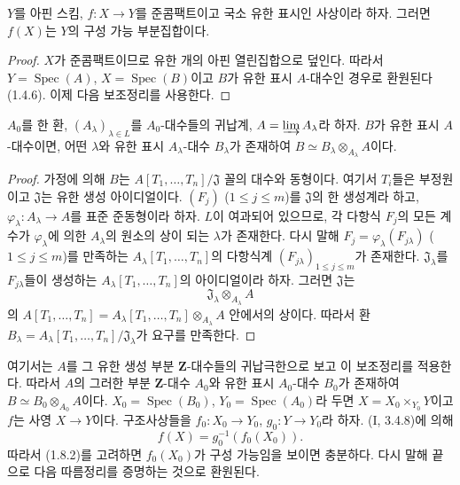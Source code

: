 \begin{lemma}[1.8.4.1]
\label{IV.1.8.4.1-fr}
$Y$를 아핀 스킴, $f:X\to Y$를 준콤팩트이고 국소 유한 표시인
사상이라 하자. 그러면 $f(X)$는 $Y$의 구성 가능 부분집합이다.
\end{lemma}

\begin{proof}
$X$가 준콤팩트이므로 유한 개의 아핀 열린집합으로 덮인다. 따라서
$Y=\operatorname{Spec}(A)$, $X=\operatorname{Spec}(B)$이고 $B$가
유한 표시 $A$-대수인 경우로 환원된다 (1.4.6). 이제 다음 보조정리를
사용한다.
\end{proof}

\begin{lemma}[1.8.4.2]
\label{IV.1.8.4.2-fr}
$A_0$를 한 환, $(A_\lambda)_{\lambda\in L}$를 $A_0$-대수들의
귀납계, $A=\varinjlim A_\lambda$라 하자. $B$가 유한 표시
$A$-대수이면, 어떤 $\lambda$와 유한 표시 $A_\lambda$-대수
$B_\lambda$가 존재하여
$B\simeq B_\lambda\otimes_{A_\lambda}A$이다.
\end{lemma}

\begin{proof}
가정에 의해 $B$는
$A[T_1,\ldots,T_n]/\mathfrak J$ 꼴의 대수와 동형이다. 여기서
$T_i$들은 부정원이고 $\mathfrak J$는 유한 생성 아이디얼이다.
$(F_j)$ ($1\leq j\leq m$)를 $\mathfrak J$의 한 생성계라 하고,
$\varphi_\lambda:A_\lambda\to A$를 표준 준동형이라 하자. $L$이
여과되어 있으므로, 각 다항식 $F_j$의 모든 계수가
$\varphi_\lambda$에 의한 $A_\lambda$의 원소의 상이 되는 $\lambda$가
존재한다. 다시 말해
$F_j=\varphi_\lambda(F_{j\lambda})$ ($1\leq j\leq m$)를 만족하는
$A_\lambda[T_1,\ldots,T_n]$의 다항식계
$(F_{j\lambda})_{1\leq j\leq m}$가 존재한다. $\mathfrak J_\lambda$를
$F_{j\lambda}$들이 생성하는 $A_\lambda[T_1,\ldots,T_n]$의
아이디얼이라 하자. 그러면 $\mathfrak J$는
\[
\mathfrak J_\lambda\otimes_{A_\lambda}A
\]
의 $A[T_1,\ldots,T_n]
=A_\lambda[T_1,\ldots,T_n]\otimes_{A_\lambda}A$ 안에서의 상이다.
따라서 환
$B_\lambda=A_\lambda[T_1,\ldots,T_n]/\mathfrak J_\lambda$가
요구를 만족한다.
\end{proof}

여기서는 $A$를 그 유한 생성 부분 $\mathbf Z$-대수들의 귀납극한으로
보고 이 보조정리를 적용한다. 따라서 $A$의 그러한 부분
$\mathbf Z$-대수 $A_0$와 유한 표시 $A_0$-대수 $B_0$가 존재하여
$B\simeq B_0\otimes_{A_0}A$이다. $X_0=\operatorname{Spec}(B_0)$,
$Y_0=\operatorname{Spec}(A_0)$라 두면
$X=X_0\times_{Y_0}Y$이고 $f$는 사영 $X\to Y$이다. 구조사상들을
$f_0:X_0\to Y_0$, $g_0:Y\to Y_0$라 하자. (I, 3.4.8)에 의해
\[
  f(X)=g_0^{-1}(f_0(X_0)).
\]
따라서 (1.8.2)를 고려하면 $f_0(X_0)$가 구성 가능임을 보이면
충분하다. 다시 말해 끝으로 다음 따름정리를 증명하는 것으로
환원된다.

